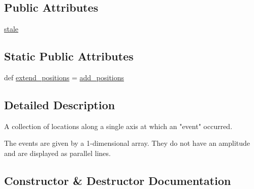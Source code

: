 \subsection*{Public Attributes}
\begin{DoxyCompactItemize}
\item 
\hyperlink{classmatplotlib_1_1collections_1_1EventCollection_a9f2423f24b9163831883d9efa49d84bf}{stale}
\end{DoxyCompactItemize}
\subsection*{Static Public Attributes}
\begin{DoxyCompactItemize}
\item 
def \hyperlink{classmatplotlib_1_1collections_1_1EventCollection_ad10ccd4598698f44599fa2c62f9bbfdc}{extend\+\_\+positions} = \hyperlink{classmatplotlib_1_1collections_1_1EventCollection_ac7cb967a80980594d16779819bdf6f3b}{add\+\_\+positions}
\end{DoxyCompactItemize}


\subsection{Detailed Description}
\begin{DoxyVerb}A collection of locations along a single axis at which an "event" occurred.

The events are given by a 1-dimensional array. They do not have an
amplitude and are displayed as parallel lines.
\end{DoxyVerb}
 

\subsection{Constructor \& Destructor Documentation}
\mbox{\label{classmatplotlib_1_1collections_1_1EventCollection_a95fbc9a0789ee33fa40642b135996b24}} 
